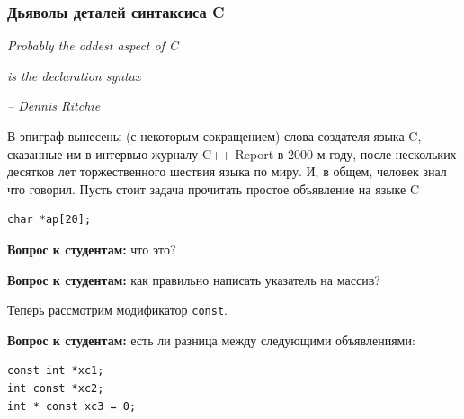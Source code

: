 \documentclass[a4paper,12pt,oneside]{article}
\newif\ifanswers
\begin{document}
\subsubsection{Дьяволы деталей синтаксиса C}\label{DevilDetails}

\hfill\textit{Probably the oddest aspect of C}

\hfill\textit{is the declaration syntax}{\vspace{0.5em}}

\hfill\textit{-- Dennis Ritchie}

В эпиграф вынесены (с некоторым сокращением) слова создателя языка C, сказанные им в интервью журналу C++ Report в 2000-м году, после нескольких десятков лет торжественного шествия языка по миру. И, в общем, человек знал что говорил. Пусть стоит задача прочитать простое объявление на языке C

% 
\begin{lstlisting}
char *ap[20];
\end{lstlisting}

\textbf{Вопрос к студентам:} что это? 

\ifanswers
Ответ: да, это массив указателей\index{Array of pointers}. 
\fi

\textbf{Вопрос к студентам:} как правильно написать указатель на массив?

\ifanswers
Ответ\index{Pointer to array}:

\begin{lstlisting}
char (*pa)[20];
\end{lstlisting}
\fi

Теперь рассмотрим модификатор \lstinline!const!. 

\textbf{Вопрос к студентам:} есть ли разница между следующими объявлениями:

\begin{lstlisting}
const int *xc1;
int const *xc2;
int * const xc3 = 0;
\end{lstlisting}

\ifanswers
Ответ: между первым и вторым нет, между вторым и третьим очень существенная разница. Во втором случае (как и в первом) речь идёт о \textbf{не константном} указателе на константные данные. В третьем случае речь идёт о \textbf{константном} указателе на не константные данные. Объявляя константу нельзя оставить её неинициализированной, поэтому инициализатор выделяет строчку, где объявлен константный указатель. В то же время, указатель на константные данные сам может быть неконстантным и инициализации не требует (хотя она возможна).
\fi
\end{document}
